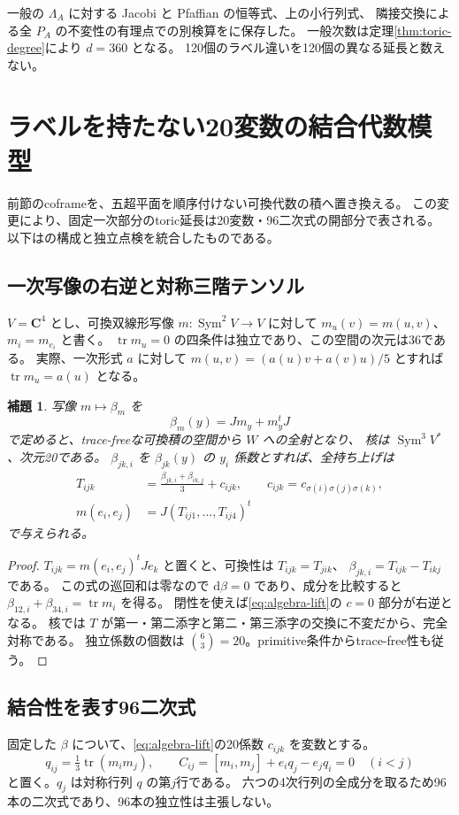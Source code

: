 \documentclass[11pt,a4paper]{ltjsarticle}
\newcommand{\CC}{\mathbf C}
\newcommand{\dd}{\mathrm d}
\DeclareMathOperator{\tr}{tr}
\newtheorem{lemma}[theorem]{補題}
\theoremstyle{remark}
\begin{document}
一般の $\Lambda_A$ に対する Jacobi と Pfaffian の恒等式、上の小行列式、
隣接交換による全 $P_A$ の不変性の有理点での別検算を\cite{coframe-certificate}に保存した。
一般次数は定理\ref{thm:toric-degree}により $d=360$ となる。
120個のラベル違いを120個の異なる延長と数えない。

\section{ラベルを持たない20変数の結合代数模型}\label{sec:algebra}
前節のcoframeを、五超平面を順序付けない可換代数の積へ置き換える。
この変更により、固定一次部分のtoric延長は20変数・96二次式の開部分で表される。
以下は\cite{algebra-certificate,algebra-review}の構成と独立点検を統合したものである。

\subsection{一次写像の右逆と対称三階テンソル}
$V=\CC^4$ とし、可換双線形写像 $m:\operatorname{Sym}^2V\to V$ に対して
$m_u(v)=m(u,v)$、$m_i=m_{e_i}$ と書く。
$\tr m_u=0$ の四条件は独立であり、この空間の次元は36である。
実際、一次形式 $a$ に対して $m(u,v)=(a(u)v+a(v)u)/5$ とすれば $\tr m_u=a(u)$ となる。

\begin{lemma}\label{lem:algebra-lift}
写像 $m\mapsto\beta_m$ を
\[
 \beta_m(y)=Jm_y+m_y^tJ
\]
で定めると、trace-freeな可換積の空間から $W$ への全射となり、
核は $\operatorname{Sym}^3V^*$、次元20である。
$\beta_{jk,i}$ を $\beta_{jk}(y)$ の $y_i$ 係数とすれば、全持ち上げは
\begin{align}
 T_{ijk}&=\frac{\beta_{jk,i}+\beta_{ik,j}}3+c_{ijk},\qquad
 c_{ijk}=c_{\sigma(i)\sigma(j)\sigma(k)},\label{eq:algebra-lift}\\
 m(e_i,e_j)&=J(T_{ij1},\ldots,T_{ij4})^t\nonumber
\end{align}
で与えられる。
\end{lemma}
\begin{proof}
$T_{ijk}=m(e_i,e_j)^tJe_k$ と置くと、可換性は $T_{ijk}=T_{jik}$、
$\beta_{jk,i}=T_{ijk}-T_{ikj}$ である。
この式の巡回和は零なので $\dd\beta=0$ であり、成分を比較すると
$\beta_{12,i}+\beta_{34,i}=\tr m_i$ を得る。
閉性を使えば\eqref{eq:algebra-lift}の $c=0$ 部分が右逆となる。
核では $T$ が第一・第二添字と第二・第三添字の交換に不変だから、完全対称である。
独立係数の個数は $\binom63=20$。primitive条件からtrace-free性も従う。
\end{proof}

\subsection{結合性を表す96二次式}
固定した $\beta$ について、\eqref{eq:algebra-lift}の20係数 $c_{ijk}$ を変数とする。
\begin{equation}\label{eq:algebra-quadrics}
 q_{ij}=\tfrac13\tr(m_i m_j),\qquad
 C_{ij}=[m_i,m_j]+e_iq_j-e_jq_i=0\quad(i<j)
\end{equation}
と置く。$q_j$ は対称行列 $q$ の第$j$行である。
六つの4次行列の全成分を取るため96本の二次式であり、96本の独立性は主張しない。
\end{document}
